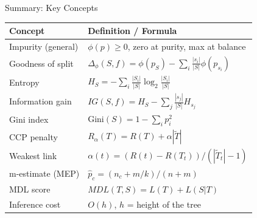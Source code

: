 \begin{frame}{Summary: Key Concepts}
  \renewcommand{\arraystretch}{1.5}
  \begin{center}
  \begin{tabular}{ll}
    \toprule
    \textbf{Concept} & \textbf{Definition / Formula} \\
    \midrule
    Impurity (general) & $\phi(p) \geq 0$, zero at purity, max at balance \\
    Goodness of split & $\Delta_\phi(S,f) = \phi(p_S) - \sum_i \frac{|s_i|}{|S|}\phi(p_{s_i})$ \\
    Entropy & $H_S = -\sum_i \frac{|S_i|}{|S|}\log_2\frac{|S_i|}{|S|}$ \\
    Information gain & $IG(S,f) = H_S - \sum_j \frac{|s_j|}{|S|}H_{s_j}$ \\
    Gini index & $\text{Gini}(S) = 1 - \sum_i p_i^2$ \\
    CCP penalty & $R_\alpha(T) = R(T) + \alpha|\tilde{T}|$ \\
    Weakest link & $\alpha(t) = (R(t)-R(T_t))/(|\tilde{T}_t|-1)$ \\
    m-estimate (MEP) & $\hat{p}_c = (n_c + m/k)/(n+m)$ \\
    MDL score & $MDL(T,S) = L(T) + L(S|T)$ \\
    Inference cost & $O(h)$, $h$ = height of the tree \\
    \bottomrule
  \end{tabular}
  \end{center}
\end{frame}

